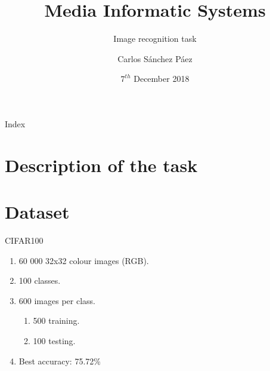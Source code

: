 \documentclass{beamer}
\title{Media Informatic Systems}
\date{$7^{th}$ December 2018}
\subtitle{Image recognition task}
\author{Carlos Sánchez Páez}
\begin{document}
\centering
\begin{frame}
 \titlepage
\end{frame}

\begin{frame}{Index}
 \tableofcontents
\end{frame}

\section{Description of the task}

\section{Dataset}
\begin{frame}[fragile]{CIFAR100}
 \begin{enumerate}
  \item<+-> 60 000 32x32 colour images (RGB).
  \item<+-> 100 classes.
  \item<+-> 600 images per class.
        \begin{enumerate}
         \item<+-> 500 training.
         \item<+-> 100 testing.
        \end{enumerate}
  \item<+-> Best accuracy: 75.72\%
 \end{enumerate}

\end{frame}
\end{document}
